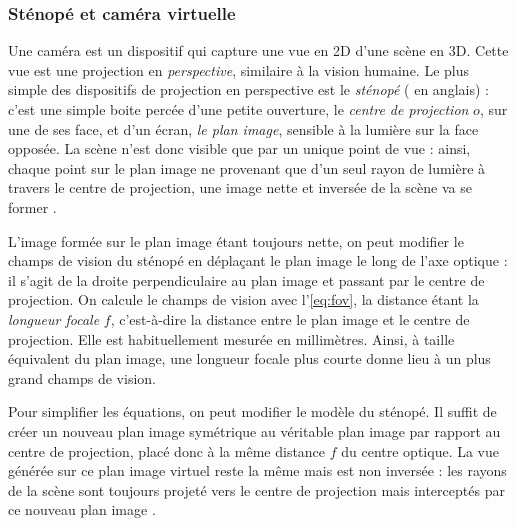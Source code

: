 \subsubsection{Sténopé et caméra virtuelle}
Une caméra est un dispositif qui capture une vue en 2D d'une scène en 3D. Cette vue est une projection en \emph{perspective}, similaire à la vision humaine. Le plus simple des dispositifs de projection en perspective est le \emph{sténopé} ( en anglais) : c'est une simple boite percée d'une petite ouverture, le \emph{centre de projection} $o$, sur une de ses face, et d'un écran, \emph{le plan image}, sensible à la lumière sur la face opposée. La scène n'est donc visible que par un unique point de vue : ainsi, chaque point sur le plan image ne provenant que d'un seul rayon de lumière à travers le centre de projection, une image nette et inversée de la scène va se former .


L'image formée sur le plan image étant toujours nette, on peut modifier le champs de vision du sténopé en déplaçant le plan image le long de l'axe optique : il s'agit de la droite perpendiculaire au plan image et passant par le centre de projection. On calcule le champs de vision avec l'\autoref{eq:fov}, la distance étant la \emph{longueur focale} $f$, c'est-à-dire la distance entre le plan image et le centre de projection. Elle est habituellement mesurée en millimètres. Ainsi, à taille équivalent du plan image, une longueur focale plus courte donne lieu à un plus grand champs de vision.

Pour simplifier les équations, on peut modifier le modèle du sténopé. Il suffit de créer un nouveau plan image symétrique au véritable plan image par rapport au centre de projection, placé donc à la même distance $f$ du centre optique. La vue générée sur ce plan image virtuel reste la même mais est non inversée : les rayons de la scène sont toujours projeté vers le centre de projection mais interceptés par ce nouveau plan image .


